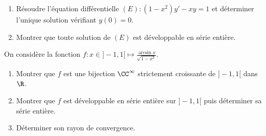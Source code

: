 \begin{enonce}
\begin{exercise}[ID={RMS126 E871},subtitle={CCP MP 2015},tags={}, difficulty={0}]
\begin{enumerate}
  \item Résoudre l'équation différentielle $(E): (1-x^2) y' - x y = 1$ et déterminer l'unique solution vérifiant $y(0)=0$.

  \item Montrer que toute solution de $(E)$ est développable en série entière.
\end{enumerate}
On considère la fonction $f:x\in]-1,1[\mapsto\frac{\arcsin x}{\sqrt{1-x^2}}$.
\begin{enumerate}[resume]
  \item Montrer que $f$ est une bijection $\CC^\infty$ strictement croissante de $]-1,1[$ dans $\R$.

  \item Montrer que $f$ est développable en série entière sur $]-1,1[$ puis déterminer sa série entière.

  \item Déterminer son rayon de convergence.

\end{enumerate}
\end{exercise}
\begin{solution}
\end{solution}
\end{enonce}
